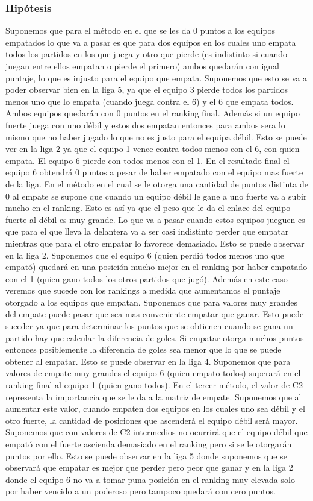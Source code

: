             \subsubsection*{Hipótesis} 
            Suponemos que para el método en el que se les da 0 puntos a los equipos empatados lo que va a pasar es que para dos equipos en los cuales uno empata todos los partidos en los que juega y otro que pierde (es indistinto si cuando juegan entre ellos empatan o pierde el primero) ambos quedarán con igual puntaje, lo que es injusto para el equipo que empata. Suponemos que esto se va a poder observar bien en la liga 5, ya que el equipo 3 pierde todos los partidos menos uno que lo empata (cuando juega contra el 6) y el 6 que empata todos. Ambos equipos quedarán con 0 puntos en el ranking final. Además si un equipo fuerte juega con uno débil y estos dos empatan entonces para ambos sera lo mismo que no haber jugado lo que no es justo para el equipa débil. Esto se puede ver en la liga 2 ya que el equipo 1 vence contra todos menos con el 6, con quien empata. El equipo 6 pierde con todos menos con el 1. En el resultado final el equipo 6 obtendrá 0 puntos a pesar de haber empatado con el equipo mas fuerte de la liga.
            En el método en el cual se le otorga una cantidad de puntos distinta de 0 al empate se supone que cuando un equipo débil le gane a uno fuerte va a subir mucho en el ranking. Esto es así ya que el peso que le da el enlace del equipo fuerte al débil es muy grande. Lo que va a pasar cuando estos equipos jueguen es que para el que lleva la delantera va a ser casi indistinto perder que empatar mientras que para el otro empatar lo favorece demasiado. Esto se puede observar en la liga 2. Suponemos que el equipo 6 (quien perdió todos menos uno que empató) quedará en una posición mucho mejor en el ranking por haber empatado con el 1 (quien gano todos los otros partidos que jugó). Además en este caso veremos que sucede con los rankings a medida que aumentamos el puntaje otorgado a los equipos que empatan. Suponemos que para valores muy grandes del empate puede pasar que sea mas conveniente empatar que ganar. Esto puede suceder ya que para determinar los puntos que se obtienen cuando se gana un partido hay que calcular la diferencia de goles. Si empatar otorga muchos puntos entonces posiblemente la diferencia de goles sea menor que lo que se puede obtener al empatar. Esto se puede observar en la liga 4. Suponemos que para valores de empate muy grandes el equipo 6 (quien empato todos) superará en el ranking final al equipo 1 (quien gano todos).
            En el tercer método, el valor de C2 representa la importancia que se le da a la matriz de empate. Suponemos que al aumentar este valor, cuando empaten dos equipos en los cuales uno sea débil y el otro fuerte, la cantidad de posiciones que ascenderá el equipo débil será mayor. Suponemos que con valores de C2 intermedios no ocurrirá que el equipo débil que empató con el fuerte ascienda demasiado en el ranking pero si se le otorgarán puntos por ello. Esto se puede observar en la liga 5 donde suponemos que se observará que empatar es mejor que perder pero peor que ganar y en la liga 2 donde el equipo 6 no va a tomar puna posición en el ranking muy elevada solo por haber vencido a un poderoso pero tampoco quedará con cero puntos. 

